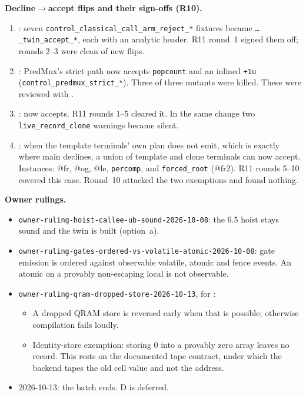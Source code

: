 \textbf{Decline$\to$accept flips and their sign-offs (R10).}
\begin{enumerate}
\item {}: seven \texttt{control\_classical\_call\_arm\_reject\_*} fixtures became \texttt{\dots\_twin\_accept\_*}, each with an analytic header. R11 round~1 signed them off; rounds 2--3 were clean of new flips.
\item {}: PredMux's strict path now accepts \texttt{popcount} and an inlined \texttt{+1u} (\texttt{control\_predmux\_strict\_*}). Three of three mutants were killed. These were reviewed with .
\item {}:  now accepts. R11 rounds 1--5 cleared it. In the same change two \texttt{live\_record\_clone} warnings became silent.
\item {}: when the template terminals' own plan does not emit, which is exactly where main declines, a union of template and clone terminals can now accept. Instances: @fr, @og, @le, \texttt{percomp}, and \texttt{forced\_root} (@fr2). R11 rounds 5--10 covered this case. Round~10 attacked the two exemptions and found nothing.
\end{enumerate}

\textbf{Owner rulings.}
\begin{itemize}
\item \texttt{owner-ruling-hoist-callee-ub-sound-2026-10-08}: the 6.5 hoist stays sound and the twin is built (option~a).
\item \texttt{owner-ruling-gates-ordered-vs-volatile-atomic-2026-10-08}: gate emission is ordered against observable volatile, atomic and fence events. An atomic on a provably non-escaping local is not observable.
\item \texttt{owner-ruling-qram-dropped-store-2026-10-13}, for :
  \begin{itemize}
  \item A dropped QRAM store is reversed early when that is possible; otherwise compilation fails loudly.
  \item Identity-store exemption: storing 0 into a provably zero array leaves no record. This rests on the documented tape contract, under which the backend tapes the old cell value and not the address.
  \end{itemize}
\item 2026-10-13: the batch ends. D is deferred.
\end{itemize}

